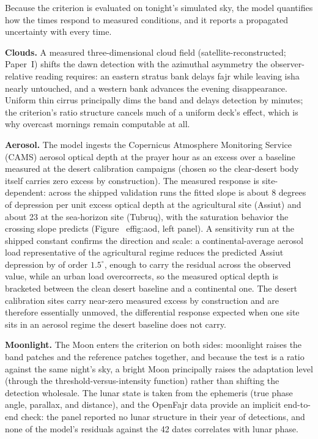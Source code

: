 \documentclass[preprint,12pt]{elsarticle}
\begin{document}
Because the criterion is evaluated on tonight's simulated sky, the model
quantifies how the times respond to measured conditions, and it reports
a propagated uncertainty with every time.

\textbf{Clouds.} A measured three-dimensional cloud field
(satellite-reconstructed; Paper~I) shifts the dawn detection with the
azimuthal asymmetry the observer-relative reading requires: an eastern
stratus bank delays fajr while leaving isha nearly untouched, and a
western bank advances the evening disappearance. Uniform thin cirrus
principally dims the band and delays detection by minutes; the criterion's
ratio structure cancels much of a uniform deck's effect, which is why
overcast mornings remain computable at all.

\textbf{Aerosol.} The model ingests the Copernicus Atmosphere
Monitoring Service (CAMS) aerosol optical depth at
the prayer hour as an excess over a baseline measured at the desert
calibration campaigns (chosen so the clear-desert body itself carries
zero excess by construction). The measured response is site-dependent:
across the shipped validation runs the fitted slope is about 8 degrees
of depression per unit excess optical depth at the agricultural site
(Assiut) and about 23 at the sea-horizon site (Tubruq), with the
saturation behavior the crossing slope predicts
(Figure~
ef{fig:aod}, left panel). A sensitivity run at the shipped
constant confirms the direction and scale: a continental-average aerosol
load representative of the agricultural regime reduces the predicted
Assiut depression by of order $1.5^\circ$, enough to carry the residual
across the observed value, while an urban load overcorrects, so the
measured optical depth is bracketed between the clean desert baseline and
a continental one. The desert calibration sites carry near-zero measured
excess by construction and are therefore essentially unmoved, the
differential response expected when one site sits in an aerosol regime
the desert baseline does not carry.

\textbf{Moonlight.} The Moon enters the criterion on both sides:
moonlight raises the band patches and the reference patches together,
and because the test is a ratio against the same night's sky, a bright
Moon principally raises the adaptation level (through the
threshold-versus-intensity function) rather than shifting the
detection wholesale. The lunar state is taken from the ephemeris
(true phase angle, parallax, and distance), and the OpenFajr data
provide an implicit end-to-end check: the panel reported no lunar
structure in their year of detections, and none of the model's
residuals against the 42 dates correlates with lunar phase.
\end{document}
